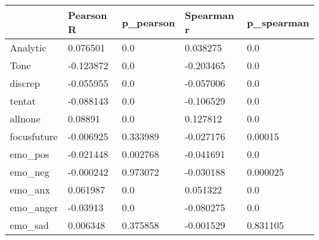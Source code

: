 \begin{tabular}{lllll}
\toprule
        & Pearson R & p\_pearson & Spearman r & p\_spearman \\
\midrule
Analytic &  0.076501 &       0.0 &   0.038275 &        0.0 \\
Tone & -0.123872 &       0.0 &  -0.203465 &        0.0 \\
discrep & -0.055955 &       0.0 &  -0.057006 &        0.0 \\
tentat & -0.088143 &       0.0 &  -0.106529 &        0.0 \\
allnone &   0.08891 &       0.0 &   0.127812 &        0.0 \\
focusfuture & -0.006925 &  0.333989 &  -0.027176 &    0.00015 \\
emo\_pos & -0.021448 &  0.002768 &  -0.041691 &        0.0 \\
emo\_neg & -0.000242 &  0.973072 &  -0.030188 &   0.000025 \\
emo\_anx &  0.061987 &       0.0 &   0.051322 &        0.0 \\
emo\_anger &  -0.03913 &       0.0 &  -0.080275 &        0.0 \\
emo\_sad &  0.006348 &  0.375858 &  -0.001529 &   0.831105 \\
\bottomrule
\end{tabular}
